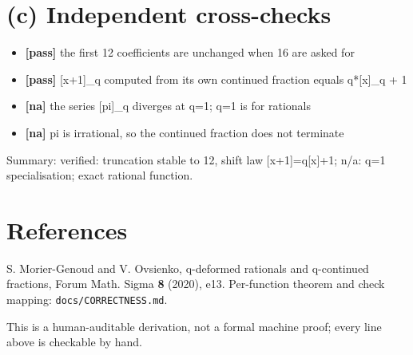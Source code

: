 \documentclass[11pt]{article}
\begin{document}
\section*{(c) Independent cross-checks}
\begin{itemize}
\item \textbf{[pass]} the first 12 coefficients are unchanged when 16 are asked for
\item \textbf{[pass]} [x+1]\_q computed from its own continued fraction equals q*[x]\_q + 1
\item \textbf{[na]} the series [pi]\_q diverges at q=1; q=1 is for rationals
\item \textbf{[na]} pi is irrational, so the continued fraction does not terminate
\end{itemize}
Summary: verified: truncation stable to 12, shift law [x+1]=q[x]+1; n/a: q=1 specialisation; exact rational function.

\section*{References}
S. Morier-Genoud and V. Ovsienko, q-deformed rationals and q-continued
fractions, Forum Math. Sigma \textbf{8} (2020), e13. Per-function theorem and
check mapping: \texttt{docs/CORRECTNESS.md}.

\medskip
\noindent This is a human-auditable derivation, not a formal machine proof;
every line above is checkable by hand.
\end{document}
